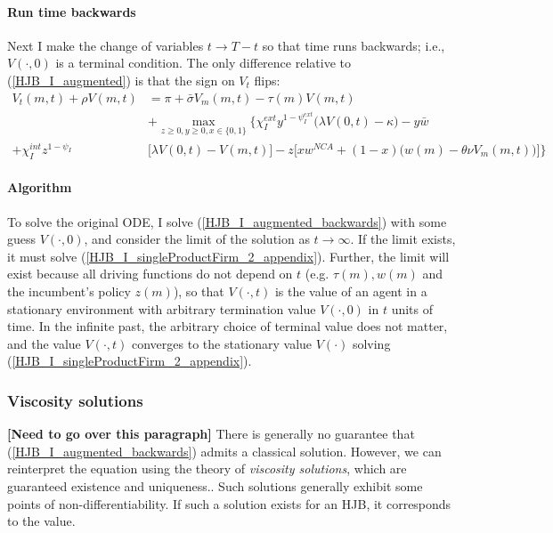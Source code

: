 \documentclass[12pt,english]{article}
\theoremstyle{remark}
\begin{document}
\paragraph{Run time backwards}
Next I make the change of variables $t \to T - t$ so that time runs backwards; i.e., $V(\cdot,0)$ is a terminal condition. The only difference relative to (\ref{HJB_I_augmented}) is that the sign on $V_t$ flips: 
\begin{align}
V_t(m,t) + \rho V(m,t) &= \pi + \bar{\sigma} V_m(m,t)  - \tau(m) V(m,t) \nonumber \\ 
& + \max_{z \ge 0, y \ge 0, x \in \{0,1\}} \Bigg\{ \chi_I^{ext} y^{1-\psi_I^{ext}} \Big( \lambda V(0,t) - \kappa \Big) - y \bar{w} \nonumber \\
+  \chi_I^{int} z^{1-\psi_I} &\Bigg[ \lambda V(0,t) - V(m,t) \Bigg] - z \Bigg[ x w^{NCA} + (1-x) \Big( w(m) - \theta \nu V_m(m,t)\Big) \Bigg] \Bigg\}  \label{HJB_I_augmented_backwards}
\end{align}

\paragraph{Algorithm}

To solve the original ODE, I solve (\ref{HJB_I_augmented_backwards}) with some guess $V(\cdot,0)$, and consider the limit of the solution as $t \to \infty$. If the limit exists, it must solve (\ref{HJB_I_singleProductFirm_2_appendix}). Further, the limit will exist because all driving functions do not depend on $t$ (e.g. $\tau(m),w(m)$ and the incumbent's policy $z(m)$), so that $V(\cdot,t)$ is the value of an agent in a stationary environment with arbitrary termination value $V(\cdot,0)$ in $t$ units of time. In the infinite past, the arbitrary choice of terminal value does not matter, and the value $V(\cdot,t)$ converges to the stationary value $V(\cdot)$ solving (\ref{HJB_I_singleProductFirm_2_appendix}).  

\subsubsection{Viscosity solutions}

\textbf{[Need to go over this paragraph]} There is generally no guarantee that (\ref{HJB_I_augmented_backwards}) admits a classical solution. However, we can reinterpret the equation using the theory of \textit{viscosity solutions}, which are guaranteed existence and uniqueness.. Such solutions generally exhibit some points of non-differentiability. If such a solution exists for an HJB, it corresponds to the value. 
\end{document}
